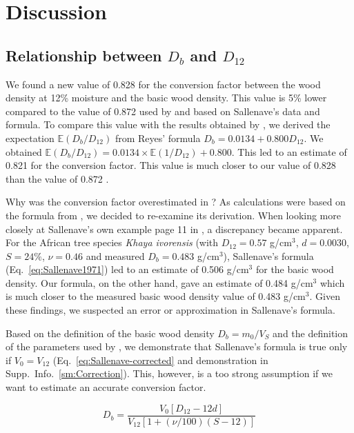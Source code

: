 \documentclass[a4paper, 12pt, leqno, dvipsnames]{article}\usepackage[]{graphicx}\usepackage[]{color}
\begin{document}
\newpage

\section{Discussion}

\subsection{Relationship between $D_b$ and $D_{12}$}

We found a new value of 0.828 for the conversion factor between the wood density at 12\% moisture and the basic wood density. This value is 5\% lower compared to the value of 0.872 used by \citet{Chave2006} and based on Sallenave's data and formula. To compare this value with the results obtained by \citet{Reyes1992}, we derived the expectation $\mathbb{E}(D_b/D_{12})$ from Reyes' formula $D_b = 0.0134 + 0.800 D_{12}$. We obtained $\mathbb{E}(D_b/D_{12}) = 0.0134 \times \mathbb{E}(1/D_{12}) + 0.800$. This led to an estimate of 0.821 for the conversion factor. This value is much closer to our value of 0.828 than the value of 0.872 \citep{Chave2006}. 

Why was the conversion factor overestimated in \citet{Chave2006}? As calculations were based on the formula from \citet{Sallenave1971}, we decided to re-examine its derivation. When looking more closely at Sallenave's own example page 11 in \citet{Sallenave1971}, a discrepancy became apparent. For the African tree species \emph{Khaya ivorensis} (with $D_{12}=0.57$ g/cm$^3$, $d=0.0030$, $S=24\%$, $\nu=0.46$ and measured $D_b=0.483$ g/cm$^3$), Sallenave's formula (Eq.~\ref{eq:Sallenave1971}) led to an estimate of 0.506 g/cm$^3$ for the basic wood density. Our formula, on the other hand, gave an estimate of 0.484 g/cm$^3$ which is much closer to the measured basic wood density value of 0.483 g/cm$^3$. Given these findings, we suspected an error or approximation in Sallenave's formula.

Based on the definition of the basic wood density $D_b=m_0/V_S$ and the definition of the parameters used by \citet{Sallenave1971}, we demonstrate that Sallenave's formula is true only if $V_0=V_{12}$ (Eq.~\ref{eq:Sallenave-corrected} and demonstration in Supp.~Info.~\ref{sm:Correction}). This, however, is a too strong assumption if we want to estimate an accurate conversion factor.

\begin{equation}
  D_b=\frac{V_0[D_{12} - 12 d]}{V_{12}[1+(\nu/100)(S-12)]}
  \label{eq:Sallenave-corrected}
\end{equation}
\end{document}

